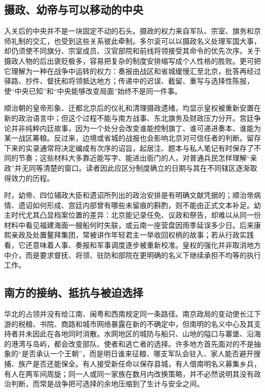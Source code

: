 \subsection*{摄政、幼帝与可以移动的中央}
入关后的中央并不是一块固定不动的石头。摄政的权力来自军队、宗室、旗务和京师礼制的交汇，也受到这些关系彼此牵制。多尔衮可以以摄政名义处理军国大事，却仍须使不同旗分、宗室成员、汉官部院和前线将领接受其命令的优先次序。关于摄政人物的后出褒贬极多，容易把复杂的制度安排缩写成个人性格的胜败。更可把它理解为一种在战争中运转的权力：奏报由战区和省城缓慢汇至北京，批答再经过驿路、抄件、督抚和将领抵达地方；传递中的迟误、截留、重写与选择性陈报，使“中央已知”和“中央能够改变局面”始终不是同一件事。

顺治朝的皇帝形象、迁都北京后的仪礼和清理摄政遗绪，均显示皇权被重新安置在新的政治语言中；但这个过程不能与南方战事、东北旗务及财政压力分开。宫廷争论并非纯粹内廷故事，因为一个处分会改变谁能控制旗丁、谁可递进奏本、谁能为某一战区筹粮。反过来，边境或省城的战报也会影响北京对可信任者的判断。留存下来的实录通常将决定编成有次序的诏旨，起居注、题本与私人笔记有时保存了不同的节奏；这些材料大多靠近能写字、能进出衙门的人，对普通兵民怎样理解“亲政”并无同等清楚的窗口。读者因此应区分制度确立的日期与其在不同辖区逐渐取得效力的历程。

时，幼帝、四位辅政大臣和遗诏所列出的政治安排是有明确文献凭据的；顺治帝病情、遗诏如何形成、宫廷内部曾有哪些未留痕的斟酌，则不能由正式文本补足。幼主时代尤其凸显档案位置的差异：北京能记录任免、议政和祭告，却难以从同一份材料中看见福建海面一艘船何时失联，或云南一座营盘因雨季延误多少日。后来康熙亲政及处置鳌拜集团，常被讲作年轻君主一举收回权柄的故事；若从行政实践看，它还意味着人事、奏报和军事调度逐步被重新校准。皇权的强化并非取消地方中介，而是要求督抚、将领、驻防和部院在更明确的名义下继续承担不均等的执行工作。

\subsection*{南方的接纳、抵抗与被迫选择}
华北的占领并没有给江南、闽粤和西南规定同一条路径。南京政局的变动使长江下游的税粮、书院、商路和城市网络暴露在新的不确定中，但南明的名义中心及其支持者并未因此在各地同时消散。水网地区的城防与船只、山地的隘口与寨堡、沿海的港湾与岛屿，都会改变部队、使者和逃亡者的选择。许多地方首先面对的不是抽象的“是否承认一个王朝”，而是明日谁来征粮、哪支军队会驻入、家人能否避开搜捕、族产是否还能保全。有人接受新任命以保存县城，有人借南明名义募集乡兵，有人在两军间周旋；同一人或同一家族在数月内改换策略，并不必然说明其没有政治判断，而常是战争把可选择的余地压缩到了生计与安全之间。

